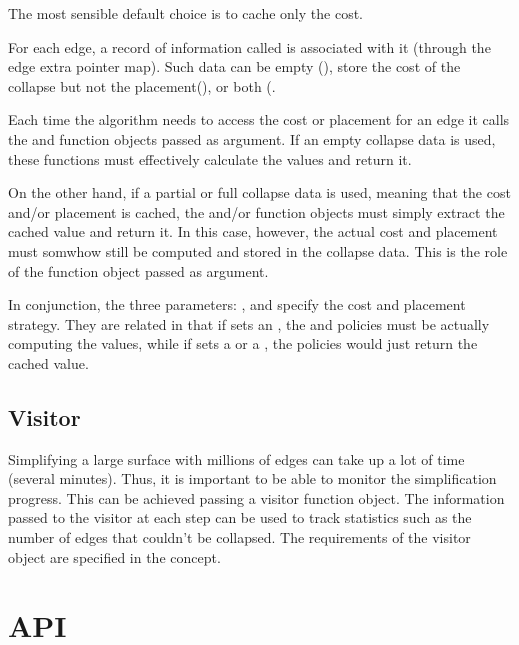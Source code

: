 The most sensible default choice is to cache only the cost.

For each edge, a record of information called  is associated with it (through the edge extra pointer map). Such data can be empty (), store the cost of the collapse but not the placement(), or both (.

Each time the algorithm needs to access the cost or placement for an edge it calls the  and  function objects passed as argument. If an empty collapse data is used, these functions must effectively calculate the values and return it.

On the other hand, if a partial or full collapse data is used, meaning that the cost and/or placement is cached, the  and/or  function objects must simply extract the cached value and return it. In this case, however, the actual cost and placement must somwhow still be computed and stored in the collapse data. This is the role of the  function object passed as argument.

In conjunction, the three parameters: ,  and  specify the cost and placement strategy. They are related in that if  sets an , the  and  policies must be actually computing the values, while if  sets a  or a , the policies would just return the cached value.

\subsection{Visitor}

Simplifying a large surface with millions of edges can take up a lot of time (several minutes). Thus, it is important to be able to monitor the simplification progress. This can be achieved passing a visitor function object. The information passed to the visitor at each step can be used to track statistics such as the number of edges that couldn't be collapsed. The requirements of the visitor object are specified in the  concept.

\section{API}

